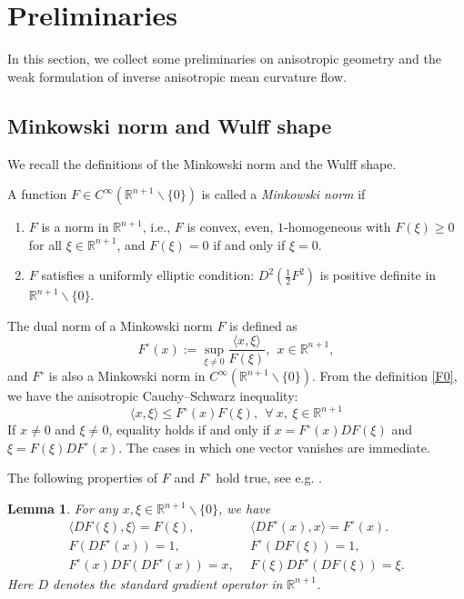 \documentclass[10pt,a4paper]{amsart}
\newtheorem{lemma}[proposition]{Lemma}
\newtheorem*{unnumremark}{Remark}
\numberwithin{equation}{section}
\begin{document}
\section{Preliminaries}
	\label{sec2}
	In this section, we collect some preliminaries on anisotropic geometry and the weak formulation of inverse anisotropic mean curvature flow.
	
	\subsection{Minkowski norm and Wulff shape}\label{sec.2-1}
	We recall the definitions of the Minkowski norm and the Wulff shape.
	
	A function $F\in C^{\infty}\left(\mathbb{R}^{n+1}\backslash\{0\}\right)$ is called a \textit{Minkowski norm} if
    \begin{enumerate}
        \item $F$ is a norm in $\mathbb{R}^{n+1}$, i.e., $F$ is convex, even, $1$-homogeneous with $F(\xi)\geq 0$ for all $\xi\in \mathbb{R}^{n+1}$, and $F(\xi)=0$ if and only if $\xi=0$.
        \item $F$ satisfies a uniformly elliptic condition: $D^2\left( \frac{1}{2}F^2 \right)$ is positive definite in $\mathbb{R}^{n+1}\backslash \{0\}$.
    \end{enumerate}
    The dual norm of a Minkowski norm  $F$ is defined as
	\begin{equation}
		F^{\circ}(x):= \sup\limits_{\xi\neq 0} \dfrac{\langle x,\xi \rangle}{F(\xi)},\ \ x\in\mathbb{R}^{n+1},
		\label{F0}
	\end{equation}
	and $F^{\circ}$ is also a Minkowski norm in $C^{\infty}\left( \mathbb{R}^{n+1}\backslash \{0\} \right)$. From the definition \eqref{F0}, we have the anisotropic Cauchy--Schwarz inequality:
	\begin{equation}
		\langle x,\xi \rangle\leq F^{\circ}(x)F(\xi),\ \ \forall\ x,\ \xi\in\mathbb{R}^{n+1}
		\label{anisocauchy}
	\end{equation}
	If $x\neq0$ and $\xi\neq0$, equality holds if and only if $x=F^{\circ}(x)DF(\xi)$ and $\xi=F(\xi)DF^{\circ}(x)$. The cases in which one vector vanishes are immediate.
	
	The following properties of $F$ and $F^{\circ}$ hold true, see e.g. \cite{BC18,CS09,Xia12}.
	\begin{lemma}
		For any $x,\xi\in\mathbb{R}^{n+1}\backslash \{0\}$, we have
		\begin{align}
			\langle DF(\xi),\xi \rangle=F(\xi),&\ \ \langle DF^{\circ}(x),x \rangle=F^{\circ}(x). \label{fprop1}\\
			F\left( DF^{\circ} (x)\right)=1,&\ \ F^{\circ} \left( DF(\xi) \right) = 1, \\
			F^{\circ}(x) DF\left( DF^{\circ}(x) \right) = x,&\ \  F(\xi) DF^{\circ} \left( DF(\xi) \right) = \xi.\label{fprop3}
		\end{align}
		Here $D$ denotes the standard gradient operator in $\mathbb{R}^{n+1}$.
	\end{lemma}
	
\end{document}
